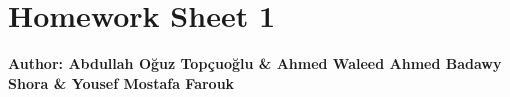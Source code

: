 \documentclass{article}
\begin{document}
\section*{\huge Homework Sheet 1}
\begin{flushright}
   \textbf{Author: Abdullah Oğuz Topçuoğlu \& Ahmed Waleed Ahmed Badawy Shora \& Yousef Mostafa Farouk}
\end{flushright}

\end{document}
